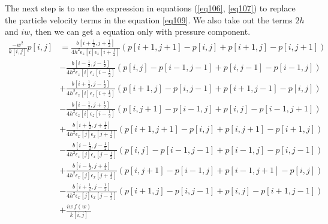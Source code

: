 \documentclass[revised,endfloat]{geophysics}
\begin{document}
The next step is to use the expression in equations (\ref{eq106}, \ref{eq107}) to replace the particle velocity terms in the equation \ref{eq109}. We also take out the terms $2h$ and $iw$,  then we can get a equation only with pressure component.
\begin{equation}
\begin{split}
\frac{-w^2}{k[i,j]}p[i,j] &= \frac{b[i+\frac{1}{2}, j+\frac{1}{2}]}{4h^2 \epsilon_z[i] \epsilon_z[i+\frac{1}{2}]} \left(p[i+1,j+1] - p[i,j] + p[i+1,j] - p[i,j+1] \right) \\
 &- \frac{b[i-\frac{1}{2}, j-\frac{1}{2}]}{4h^2 \epsilon_z[i] \epsilon_z[i-\frac{1}{2}]} \left(p[i,j] - p[i-1,j-1] + p[i,j-1] - p[i-1,j] \right) \\
 &+ \frac{b[i+\frac{1}{2}, j-\frac{1}{2}]}{4h^2 \epsilon_z[i] \epsilon_z[i+\frac{1}{2}]} \left(p[i+1,j] - p[i,j-1] + p[i+1,j-1] - p[i,j] \right) \\
 &- \frac{b[i-\frac{1}{2}, j+\frac{1}{2}]}{4h^2 \epsilon_z[i] \epsilon_z[i-\frac{1}{2}]} \left(p[i,j+1] - p[i-1,j] + p[i,j] - p[i-1,j+1] \right) \\
 &+ \frac{b[i+\frac{1}{2}, j+\frac{1}{2}]}{4h^2 \epsilon_x[j] \epsilon_x[j+\frac{1}{2}]} \left(p[i+1,j+1] - p[i,j] + p[i,j+1] - p[i+1,j] \right) \\
 &- \frac{b[i-\frac{1}{2}, j-\frac{1}{2}]}{4h^2 \epsilon_x[j] \epsilon_x[j-\frac{1}{2}]} \left(p[i,j] - p[i-1,j-1] + p[i-1,j] - p[i,j-1] \right) \\
 &+ \frac{b[i-\frac{1}{2}, j+\frac{1}{2}]}{4h^2 \epsilon_x[j] \epsilon_x[j+\frac{1}{2}]} \left(p[i,j+1] - p[i-1,j] + p[i-1,j+1] - p[i,j] \right) \\
 &- \frac{b[i+\frac{1}{2}, j-\frac{1}{2}]}{4h^2 \epsilon_x[j] \epsilon_x[j-\frac{1}{2}]} \left(p[i+1,j] - p[i,j-1] + p[i,j] - p[i+1,j-1] \right) \\
 &+ \frac{iw \,f(w)}{k[i,j]}
\end{split}
\label{eq110}
\end{equation}
\end{document}
